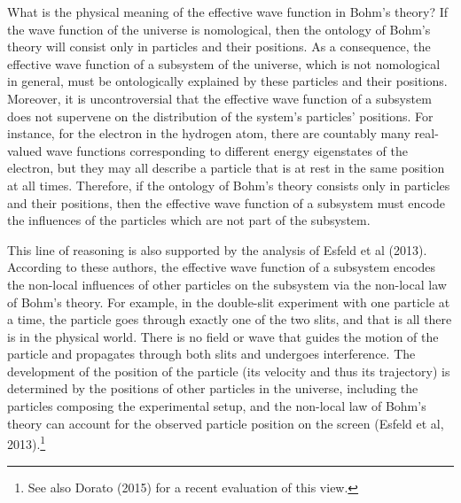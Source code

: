 What is the physical meaning of the effective wave function in Bohm's theory? 
If the wave function of the universe is nomological, then the ontology of Bohm's theory will consist only in particles and their positions. As a consequence, the effective wave function of a subsystem of the universe, which is not nomological in general, must be ontologically explained by these particles and their positions. Moreover, it is uncontroversial that the effective wave function of a subsystem does not supervene on the distribution of the system's particles' positions. For instance, for the electron in the hydrogen atom, there are countably many real-valued wave functions corresponding to different energy eigenstates of the electron, but they may all describe a particle that is at rest in the same position at all times. Therefore, if the ontology of Bohm's theory consists only in particles and their positions, then the effective wave function of a subsystem must encode the influences of the particles which are not part of the subsystem. 

This line of reasoning is also supported by the analysis of Esfeld et al (2013). According to these authors, the effective wave function of a subsystem encodes the non-local influences of other particles on the subsystem via the non-local law of Bohm's theory. For example, in the double-slit experiment with one particle at a time, the particle goes through exactly one of the two slits, and that is all there is in the physical world. There is no field or wave that guides the motion of the particle and propagates through both slits and undergoes interference. The development of the position of the particle (its velocity and thus its trajectory) is determined by the positions of other particles in the universe, including the particles composing the experimental setup, and the non-local law of Bohm's theory can account for the observed particle position on the screen (Esfeld et al, 2013).\footnote{See also Dorato (2015) for a recent  evaluation of this view.}

